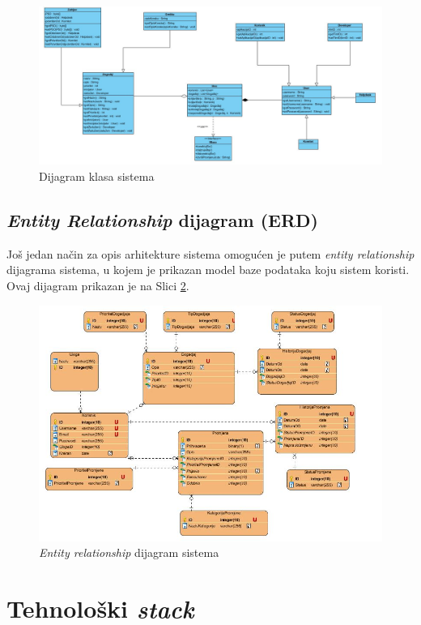 \documentclass[12pt,a4paper]{article}
\begin{document}
\begin{figure}[H]
\center
\includegraphics[scale=0.45]{../res/class.JPG}
\caption{Dijagram klasa sistema}
\label{class}
\end{figure}

\subsection{\textit{Entity Relationship} dijagram (ERD)}

Još jedan način za opis arhitekture sistema omogućen je putem \textit{entity relationship} dijagrama sistema, u kojem je prikazan model baze podataka koju sistem koristi. Ovaj dijagram prikazan je na Slici \ref{erd}.

\begin{figure}[H]
\center
\includegraphics[scale=0.5]{../res/erd.JPG}
\caption{\textit{Entity relationship} dijagram sistema}
\label{erd}
\end{figure}

\newpage

\section{Tehnološki \textit{stack}}
\end{document}
